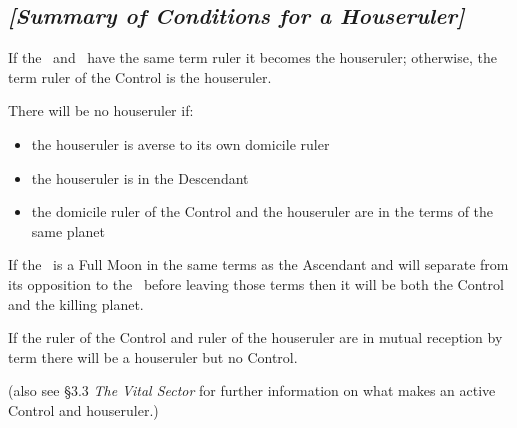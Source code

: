 \newpage

\vspace{1em}
\begin{mdframed}[backgroundcolor=cyan!5]
\subsection{\textit{[Summary of Conditions for a Houseruler]}}

If the \Sun\, and \Moon\, have the same term ruler it becomes the houseruler; otherwise, the term ruler of the Control is the houseruler.

\noindent There will be no houseruler if:
\vspace{-1em}
\begin{itemize}
\item the houseruler is averse to its own domicile ruler
\item the houseruler is in the Descendant
\item the domicile ruler of the Control and the houseruler are in the terms of the same planet
\end{itemize}

If the \Moon\, is a Full Moon in the same terms as the Ascendant and will separate from its opposition to the \Sun\, before leaving those terms then it will be both the Control and the killing planet.

If the ruler of the Control and ruler of the houseruler are in mutual reception by term there will be a houseruler but no Control.

(also see \S3.3 \textsl{The Vital Sector} for further information on what makes an active Control and houseruler.)
\end{mdframed}

\newpage
